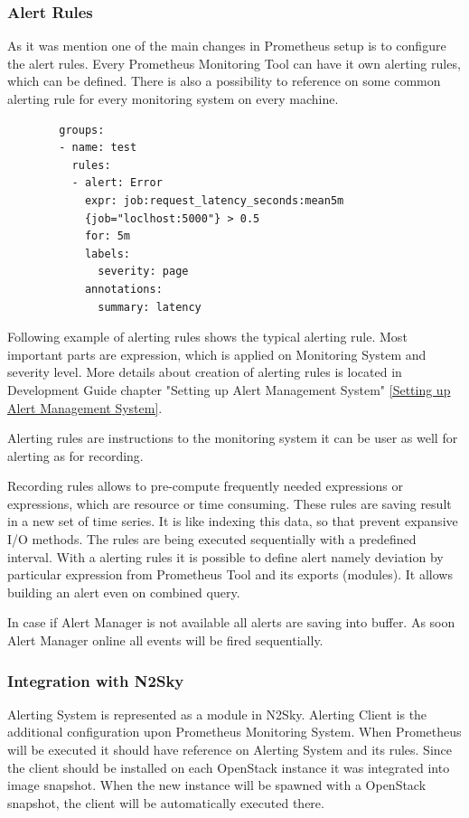 \subsubsection{Alert Rules}\label{Alert Rules}

As it was mention one of the main changes in Prometheus setup is to configure the alert rules. Every Prometheus Monitoring Tool can have it own alerting rules, which can be defined. There is also a possibility to reference on some common alerting rule for every monitoring system on every machine. 

 \begin{lstlisting}
		groups:
		- name: test
		  rules:
		  - alert: Error
		    expr: job:request_latency_seconds:mean5m
		    {job="loclhost:5000"} > 0.5
		    for: 5m
		    labels:
		      severity: page
		    annotations:
		      summary: latency
\end{lstlisting}

Following example of alerting rules shows the typical alerting rule. Most important parts are expression, which is applied on Monitoring System and severity level.  More details about creation of alerting rules is located in Development Guide chapter "Setting up Alert Management System" \autoref{Setting up Alert Management System}.

Alerting rules are instructions to the monitoring system it can be user as well for alerting as for recording. 

Recording rules allows to pre-compute frequently needed expressions or expressions, which are resource or time consuming.  These rules are saving result in a new set of time series. It is like indexing this data, so that prevent expansive I/O methods. 
The rules are being executed sequentially with a predefined interval. 
With a alerting rules it is possible to define alert namely deviation by particular expression from Prometheus Tool and its exports (modules). It allows building an alert even on combined query. 

In case if Alert Manager is not available all alerts are saving into buffer. As soon Alert Manager online all events will be fired sequentially. 



\subsubsection{Integration with N2Sky}\label{Integration with N2Sky Alerting}

Alerting System is represented as a module in N2Sky. 
Alerting Client is the additional configuration upon Prometheus Monitoring System. When Prometheus will be executed it should have reference on Alerting System and its rules. 
Since the client should be installed on each OpenStack instance it was integrated into image snapshot. When the new instance will be spawned with a OpenStack snapshot, the client will be automatically executed there.  

